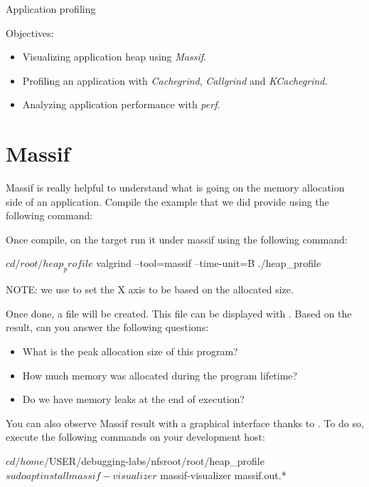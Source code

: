 \subchapter
{Application profiling}
{Objectives:
  \begin{itemize}
    \item Visualizing application heap using {\em Massif}.
    \item Profiling an application with {\em Cachegrind}, {\em Callgrind} and
          {\em KCachegrind}.
    \item Analyzing application performance with {\em perf}.
  \end{itemize}
}

\section{Massif}

Massif is really helpful to understand what is going on the memory allocation
side of an application. Compile the  example that we did provide
using the following command:


Once compile, on the target run it under massif using the following command:

\begin{bashinput}
$ cd /root/heap_profile
$ valgrind --tool=massif --time-unit=B ./heap_profile
\end{bashinput}

NOTE: we use  to set the X axis to be based on the allocated
size.

Once done, a  file will be created. This file can be
displayed with . Based on the result, can you answer the
following questions:
\begin{itemize}
  \item What is the peak allocation size of this program?
  \item How much memory was allocated during the program lifetime?
  \item Do we have memory leaks at the end of execution?
\end{itemize}

You can also observe Massif result with a graphical interface thanks to
. To do so, execute the following commands on your
development host:

\begin{bashinput}
$ cd /home/$USER/debugging-labs/nfsroot/root/heap_profile
$ sudo apt install massif-visualizer
$ massif-visualizer massif.out.*
\end{bashinput}

